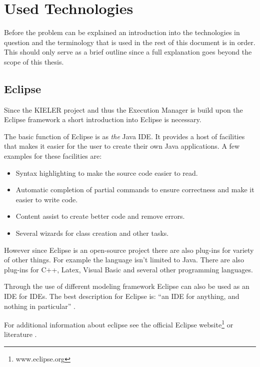 \chapter{Used Technologies}
\label{chapter:ConfTechnology}
Before the problem can be explained an introduction into the technologies in question
and the terminology that is used in the rest of this document is in order. This should
only serve as a brief outline since a full explanation goes beyond the scope of this
thesis.

\section{Eclipse}
\label{section:ConfTechEclipse}
Since the \ac{KIELER} project and thus the Execution Manager is build upon the 
Eclipse framework a short introduction into Eclipse is necessary.

The basic function of Eclipse is as \textit{the} Java \ac{IDE}. It provides
a host of facilities that makes it easier for the user to create their own Java applications.
A few examples for these facilities are:
\begin{itemize}
 \item Syntax highlighting to make the source code easier to read.
 \item Automatic completion of partial commands to ensure correctness
and make it easier to write code.
 \item Content assist to create better code and remove errors.
 \item Several wizards for class creation and other tasks.
\end{itemize}

However since Eclipse is an open-source project there are also plug-ins for variety of
other things. For example the language isn't limited to Java. There are also plug-ins
for C++, Latex, Visual Basic and several other programming languages.

Through the use of different modeling framework Eclipse can also be used as an \ac{IDE}
for \ac{IDE}s. The best description for Eclipse is: ``an IDE for anything, and nothing in particular'' \cite{eclipseOverview}.

For additional information about eclipse see the official Eclipse website\footnote{www.eclipse.org} or literature \cite{eclipsePlugins}.



